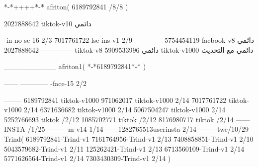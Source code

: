 *-*++++*-*
afriton(
6189792841 /8/8
)

2027888642 tiktok-v10
دائمي

-in-no-se-16 2/3
7017761722-lse-ins-v1 2/9
------------
5754454119 facbook-v8
دائمي
--------------
2027888642 tiktok-v8
دائمي
5909533996 tiktok-v1000
دائمي مع التحديث

__________
afriton1(
*-*6189792841*-*
)

------
------------
-face-15 2/2

--------
6189792841 tiktok-v1000
971062017 tiktok-v1000 2/14
7017761722 tiktok-v1000 2/14
6371636682 tiktok-v1000 2/14
5067504247 tiktok-v1000 2/14
5252766693 tiktok /2/12
1085702771 tiktok /2/12
8176980717 tiktok /2/14
------
 INSTA /1/25
-------
-m-v14 1/14
-----
1282765513userinsta 2/14
------
-twe/10/29
Trind(
6189792841-Trind-v1 
7161764956-Trind-v1 2/13
7408858851-Trind-v1 2/10
5043579682-Trind-v1 2/11
125262421-Trind-v1 2/13
6713560109-Trind-v1 2/14
5771626564-Trind-v1 2/14
7303430309-Trind-v1 2/14
)
